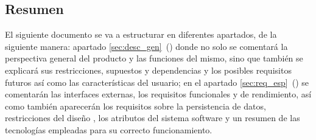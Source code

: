 \subsection{Resumen}
El siguiente documento se va a estructurar en diferentes apartados, de la siguiente manera: apartado \ref{sec:desc_gen}~() donde no solo se comentará la perspectiva general del producto y las funciones del mismo, sino que también se explicará sus restricciones, supuestos y dependencias y los posibles requisitos futuros así como las características del usuario; en el apartado \ref{sec:req_esp}~() se comentarán las interfaces externas, los requisitos funcionales y de rendimiento, así como también aparecerán los requisitos sobre la persistencia de datos, restricciones del diseño , los atributos del sistema software y un resumen de las tecnologías empleadas para su correcto funcionamiento.
